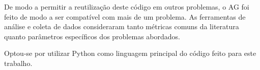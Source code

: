 De modo a permitir a reutilização deste código em outros problemas, o AG foi feito de modo a ser compatível com mais de um problema. As ferramentas de análise e coleta de dados consideraram tanto métricas comuns da literatura quanto parâmetros específicos dos problemas abordados.

Optou-se por utilizar Python como linguagem principal do código feito para este trabalho.










